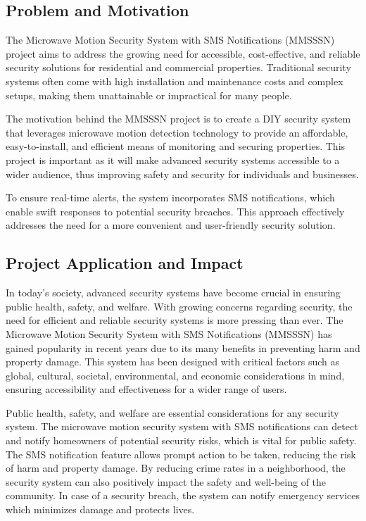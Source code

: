 \documentclass[conference]{IEEEtran}
\begin{document}
\subsection{Problem and Motivation}

The Microwave Motion Security System with SMS Notifications (MMSSSN) project aims to
address the growing need for accessible, cost-effective, and reliable security solutions
for residential and commercial properties. Traditional security systems often come with high
installation and maintenance costs and complex setups, making them unattainable or
impractical for many people.

The motivation behind the MMSSSN project is to create a DIY security system that leverages
microwave motion detection technology to provide an affordable, easy-to-install, and
efficient means of monitoring and securing properties. This project is important as it will
make advanced security systems accessible to a wider audience, thus improving safety and
security for individuals and businesses.

To ensure real-time alerts, the system incorporates SMS notifications, which enable swift
responses to potential security breaches. This approach effectively addresses the need for a
more convenient and user-friendly security solution.

\subsection{Project Application and Impact}

In today's society, advanced security systems have become crucial in ensuring public health,
safety, and welfare. With growing concerns regarding security, the need for efficient and
reliable security systems is more pressing than ever. The Microwave Motion Security System
with SMS Notifications (MMSSSN) has gained popularity in recent years due to its many
benefits in preventing harm and property damage. This system has been designed with critical
factors such as global, cultural, societal, environmental, and economic considerations in
mind, ensuring accessibility and effectiveness for a wider range of users.

Public health, safety, and welfare are essential considerations for any security system.
The microwave motion security system with SMS notifications can detect and notify
homeowners of potential security risks, which is vital for public safety.
The SMS notification feature allows prompt action to be taken, reducing the risk of harm
and property damage. By reducing crime rates in a neighborhood, the security system can
also positively impact the safety and well-being of the community. In case of a security
breach, the system can notify emergency services which minimizes damage and protects lives.
\end{document}
